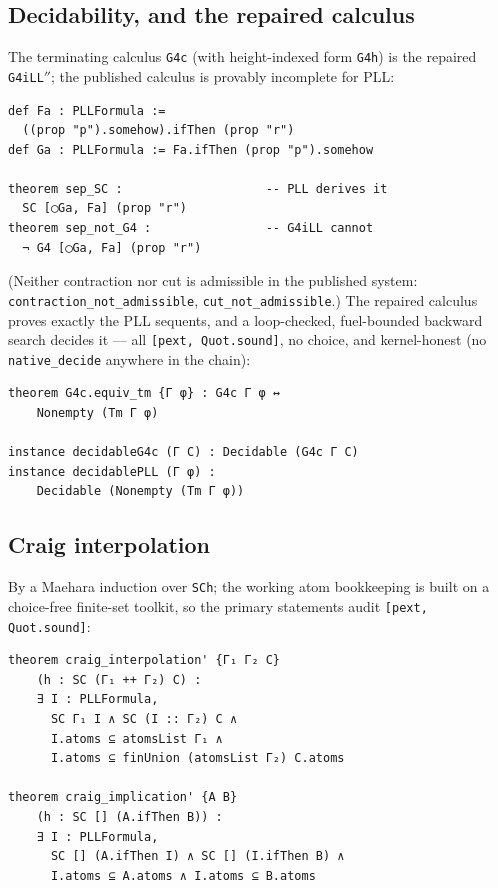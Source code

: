 \subsection{Decidability, and the repaired calculus}

The terminating calculus \texttt{G4c} (with height-indexed form
\texttt{G4h}) is the repaired \texttt{G4iLL\ensuremath{{}''}}; the published
calculus is provably incomplete for PLL:

\begin{lstlisting}
def Fa : PLLFormula :=
  ((prop "p").somehow).ifThen (prop "r")
def Ga : PLLFormula := Fa.ifThen (prop "p").somehow

theorem sep_SC :                    -- PLL derives it
  SC [◯Ga, Fa] (prop "r")
theorem sep_not_G4 :                -- G4iLL cannot
  ¬ G4 [◯Ga, Fa] (prop "r")
\end{lstlisting}

\noindent (Neither contraction nor cut is admissible in the published
system: \texttt{contraction\_not\_admissible},
\texttt{cut\_not\_admissible}.) The repaired calculus proves exactly the
PLL sequents, and a loop-checked, fuel-bounded backward search decides
it — all \texttt{[pext, Quot.sound]}, no choice, and kernel-honest
(no \texttt{native\_decide} anywhere in the chain):

\begin{lstlisting}
theorem G4c.equiv_tm {Γ φ} : G4c Γ φ ↔
    Nonempty (Tm Γ φ)

instance decidableG4c (Γ C) : Decidable (G4c Γ C)
instance decidablePLL (Γ φ) :
    Decidable (Nonempty (Tm Γ φ))
\end{lstlisting}

\subsection{Craig interpolation}\label{app:craig}

By a Maehara induction over \texttt{SCh}; the working atom bookkeeping
is built on a choice-free finite-set toolkit, so the primary statements
audit \texttt{[pext, Quot.sound]}:

\begin{lstlisting}
theorem craig_interpolation' {Γ₁ Γ₂ C}
    (h : SC (Γ₁ ++ Γ₂) C) :
    ∃ I : PLLFormula,
      SC Γ₁ I ∧ SC (I :: Γ₂) C ∧
      I.atoms ⊆ atomsList Γ₁ ∧
      I.atoms ⊆ finUnion (atomsList Γ₂) C.atoms

theorem craig_implication' {A B}
    (h : SC [] (A.ifThen B)) :
    ∃ I : PLLFormula,
      SC [] (A.ifThen I) ∧ SC [] (I.ifThen B) ∧
      I.atoms ⊆ A.atoms ∧ I.atoms ⊆ B.atoms
\end{lstlisting}

